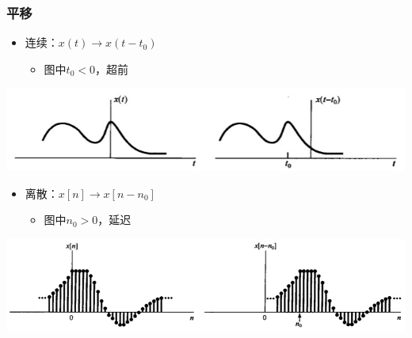 \documentclass[CJKutf8,dvipsnames,table]{beamer}
\begin{document}
\begin{CJK*}{UTF8}{song}
  \begin{frame}
    \frametitle{平移}
    \begin{itemize}
    \item 连续：$x(t) \rightarrow x(t-t_0)$
        \begin{itemize}
        \item 图中$t_0<0$，超前
        \end{itemize}
    \end{itemize}
    \begin{center}
      \includegraphics[scale=.4]{cshift}
    \end{center}
    \begin{itemize}
    \item 离散：$x[n] \rightarrow x[n-n_0]$    
        \begin{itemize}
        \item 图中$n_0>0$，延迟
        \end{itemize}
    \end{itemize}
    \begin{center}
      \includegraphics[scale=.3]{dshift}
    \end{center}
  \end{frame}  


\end{CJK*}
\end{document}
